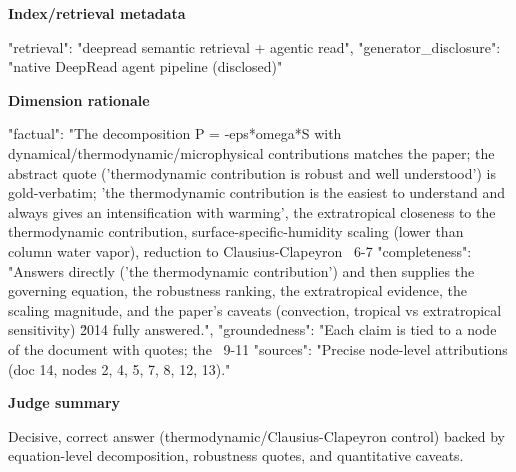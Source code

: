 \documentclass[10pt]{article}
\begin{document}
\textbf{Index/retrieval metadata}
\begin{EvidenceText}
{
  "retrieval": "deepread semantic retrieval + agentic read",
  "generator_disclosure": "native DeepRead agent pipeline (disclosed)"
}
\end{EvidenceText}

\textbf{Dimension rationale}
\begin{EvidenceText}
{
  "factual": "The decomposition P = -eps*omega*S with dynamical/thermodynamic/microphysical contributions matches the paper; the abstract quote ('thermodynamic contribution is robust and well understood') is gold-verbatim; 'the thermodynamic contribution is the easiest to understand and always gives an intensification with warming', the extratropical closeness to the thermodynamic contribution, surface-specific-humidity scaling (lower than column water vapor), reduction to Clausius-Clapeyron ~6-7%
  "completeness": "Answers directly ('the thermodynamic contribution') and then supplies the governing equation, the robustness ranking, the extratropical evidence, the scaling magnitude, and the paper's caveats (convection, tropical vs extratropical sensitivity) \u2014 fully answered.",
  "groundedness": "Each claim is tied to a node of the document with quotes; the ~9-11%
  "sources": "Precise node-level attributions (doc 14, nodes 2, 4, 5, 7, 8, 12, 13)."
}
\end{EvidenceText}

\textbf{Judge summary}
\begin{EvidenceText}
Decisive, correct answer (thermodynamic/Clausius-Clapeyron control) backed by equation-level decomposition, robustness quotes, and quantitative caveats.
\end{EvidenceText}
\end{document}
